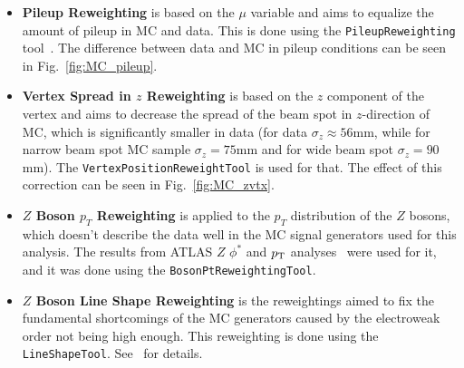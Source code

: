 \begin{itemize}
\item \textbf{Pileup Reweighting} is based on the $\mu$ variable and aims to equalize the amount of pileup in MC and data. This is done using the \texttt{PileupReweighting} tool~\cite{lib:pileuptool, lib:pileupscale}. The difference between data and MC in pileup conditions can be seen in Fig.~\ref{fig:MC_pileup}.
\item \textbf{Vertex Spread in $z$ Reweighting} is based on the $z$ component of the vertex and aims to decrease the spread of the beam spot in $z$-direction of MC, which is significantly smaller in data (for data $\sigma_z \approx 56$mm, while for narrow beam spot MC sample $\sigma_z = 75$mm and for wide beam spot $\sigma_z = 90$mm). The \texttt{VertexPositionReweightTool} is used for that. The effect of this correction can be seen in Fig.~\ref{fig:MC_zvtx}.
\item \textbf{$Z$ Boson $p_T$ Reweighting} is applied to the $p_T$ distribution of the $Z$ bosons, which doesn't describe the data well in the MC signal generators used for this analysis. The results from ATLAS $Z$ $\phi^*$ and $p_{\mathrm{T}}$ analyses~\cite{lib:Zphistar} were used for it, and it was done using the \texttt{BosonPtReweightingTool}.
\item \textbf{$Z$ Boson Line Shape Reweighting} is the reweightings aimed to fix the fundamental shortcomings of the MC generators caused by the electroweak order not being high enough. This reweighting is done using the \texttt{LineShapeTool}. See~\cite{lib:lineshape} for details.
\end{itemize}

